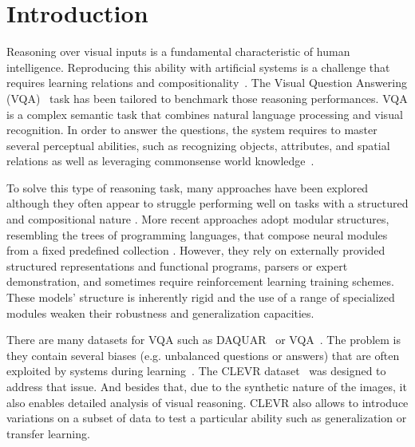 \section{Introduction}
Reasoning over visual inputs is a fundamental characteristic of human intelligence.
Reproducing this ability with artificial systems is a challenge that requires learning relations and compositionality~\citep{hu2017learning, johnson2017inferring}. The Visual Question Answering (VQA)~\citep{antol2015vqa,malinowski2014towards,wu2017visual} task has been tailored to benchmark those reasoning performances. VQA is a complex semantic task that combines natural language processing and visual recognition.
In order to answer the questions, the system requires to master several perceptual abilities, such as recognizing objects, attributes, and spatial relations as well as leveraging commonsense world knowledge~\citep{hudson2018compositional}.

To solve this type of reasoning task, many approaches have been explored although they often appear to struggle performing well on tasks with a structured and compositional nature \citep{hudson2018compositional}.
More recent approaches adopt modular structures, resembling the trees of programming languages, that compose neural modules from a fixed predefined collection \cite{andreas2016learning,johnson2017inferring, mascharka2018transparency}. However, they rely on externally provided structured representations and functional programs, parsers or expert demonstration, and sometimes require reinforcement learning training schemes.
These models' structure is inherently rigid and the use of a range of specialized modules weaken their robustness and generalization capacities.

There are many datasets for VQA such as DAQUAR~\citep{malinowski2014multi} or VQA~\citep{antol2015vqa}. The problem is they contain several biases (e.g. unbalanced questions or answers) that are often exploited by systems during learning~\citep{goyal2017making}.
The CLEVR dataset~\citep{johnson2017clevr} was designed to address that issue.
And besides that, due to the synthetic nature of the images, it also enables detailed analysis of visual reasoning.
CLEVR also allows to introduce variations on a subset of data to test a particular ability such as generalization or transfer learning.


